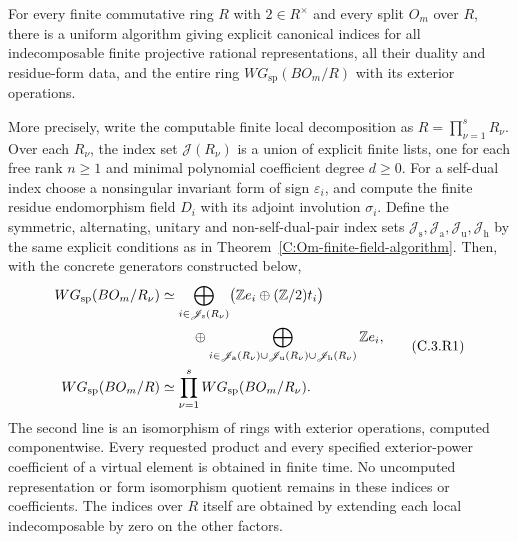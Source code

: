 \begin{theorem}
\label{C:Om-finite-base-algorithm}
For every finite commutative ring $R$ with $2\in R^\times$ and every
split $O_m$ over $R$, there is a uniform algorithm giving explicit
canonical indices for all indecomposable finite projective rational
representations, all their duality and residue-form data, and the
entire ring $WG_{\mathrm{sp}}(BO_m/R)$ with its exterior operations.

More precisely, write the computable finite local decomposition as
$R=\prod_{\nu=1}^sR_\nu$. Over each $R_\nu$, the index set
$\mathscr J(R_\nu)$ is a union of explicit finite lists, one for each
free rank $n\geq1$ and minimal polynomial coefficient degree $d\geq0$.
For a self-dual index choose a nonsingular invariant form of sign
$\varepsilon_i$, and compute the finite residue endomorphism field
$D_i$ with its adjoint involution $\sigma_i$. Define the symmetric,
alternating, unitary and non-self-dual-pair index sets
$\mathscr J_{\mathrm s},\mathscr J_{\mathrm a},
\mathscr J_{\mathrm u},\mathscr J_{\mathrm h}$ by the same explicit
conditions as in Theorem~\ref{C:Om-finite-field-algorithm}.
Then, with the concrete generators constructed below,
\[
 \begin{split}
 WG_{\mathrm{sp}}(BO_m/R_\nu)
   &\simeq
    \bigoplus_{i\in\mathscr J_{\mathrm s}(R_\nu)}
       \bigl(\mathbb Z e_i\oplus(\mathbb Z/2)t_i\bigr)\\
   &\hspace{8mm}\oplus
    \bigoplus_{i\in
      \mathscr J_{\mathrm a}(R_\nu)\cup
      \mathscr J_{\mathrm u}(R_\nu)\cup
      \mathscr J_{\mathrm h}(R_\nu)}
       \mathbb Z e_i,\\
 WG_{\mathrm{sp}}(BO_m/R)
   &\simeq \prod_{\nu=1}^s WG_{\mathrm{sp}}(BO_m/R_\nu).
 \end{split}                                             \tag{C.3.R1}
\]
The second line is an isomorphism of rings with exterior operations,
computed componentwise. Every requested product and every specified
exterior-power coefficient of a virtual element is obtained in
finite time. No uncomputed representation or form isomorphism
quotient remains in these indices or coefficients.
The indices over $R$ itself are obtained by extending each local
indecomposable by zero on the other factors.
\end{theorem}
